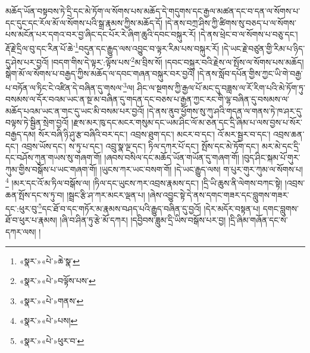མཆོད་ཡོན་བསྟབས་ཏེ་དྲི་དང་མེ་ཏོག་ལ་སོགས་པས་མཆོད་དེ་གདུགས་དང་རྒྱལ་མཚན་དང་བ་དན་ལ་སོགས་པ་དང་དུང་དང་རོལ་མོ་ལ་སོགས་པའི་སྒྲ་རྣམས་ཀྱིས་མཆོད་དོ། །དེ་ནས་བཀྲ་ཤིས་ཀྱི་ཚིགས་སུ་བཅད་པ་ལ་སོགས་པས་མངོན་པར་དགའ་བར་བྱ་ཞིང་དང་པོར་རེ་ཞིག་ཆུའི་དབང་བསྐུར་རོ། །དེ་ནས་ཕྲེང་བ་ལ་སོགས་པ་བཅུ་དང་། རྡོ་རྗེ་དྲིལ་བུ་དང་རིན་པོ་ཆེ་\footnote{«སྣར་»«པེ་»ཆེ་སྣ་}བདུན་དང་རྒྱུད་ལས་འབྱུང་བ་ལྟར་རིམ་པས་བསྐུར་རོ། །དེ་ཡང་རྗེ་བཙུན་གྱི་རིམ་པ་ཉིད་དུ་ཤེས་པར་བྱའོ། །བདག་གིས་དེ་ལྟར་:ལྟོས་པས་\footnote{«སྣར་»«པེ་»བལྟོས་པས་}མ་བྲིས་སོ། །དབང་བསྐུར་བའི་རྗེས་ལ་སྤོས་ལ་སོགས་པས་མཆོད། སྒེག་མོ་ལ་སོགས་པ་བརྒྱད་ཀྱིས་མཆོད་ལ་དབང་གཞན་བསྐུར་བར་བྱའོ། །དེ་ནས་སློབ་དཔོན་གྱིས་ཀྱང་ཡི་གེ་བརྒྱ་པ་བཏོན་ལ་ཏིང་ངེ་འཛིན་དེ་བཞིན་དུ་གསལ་\footnote{«སྣར་»«པེ་»གནས་}ལ། ཤིང་ལ་སྔགས་ཀྱི་རྒྱལ་པོ་མང་དུ་བཟླས་ལ་རོ་རིག་པའི་མེ་ཏོག་ཏུ་བསམས་ལ་དོར་བའམ་ཡང་ན་སྔ་མ་བཞིན་དུ་གདན་དང་བཅས་པ་རྒྱན་ཀྱང་རང་གི་ལྷ་བཞིན་དུ་བསམས་ལ་མཆོད་པའམ་ཡང་ན་གང་དུ་ཡང་མི་བསམ་པར་བྱའོ། །དེ་ནས་ནུབ་ཕྱོགས་སུ་ཀུ་ཤའི་གདན་ལ་གནས་ཏེ་ཁ་ཤར་དུ་བལྟས་ཏེ་སྦྱིན་སྲེག་བྱའོ། །རྫས་མར་ཁུ་དང་མངར་གསུམ་དང་ཡམ་ཤིང་ལོ་མ་ཅན་དང་དྲི་ཞིམ་པ་ལས་བྱས་པ་སོར་བརྒྱད་དམ། སོར་བཞི་ཉི་ཤུ་རྩ་བཞིའི་བར་དང་། འབྲས་ཐུག་དང་། མངར་བ་དང་། འོ་མར་སྦྱར་བ་དང་། འབྲས་ཆན་དང་། འབྲས་ཡོས་དང་། ས་ཏུ་པ་དང་། འབྲུ་སྣ་ལྔ་དང་། ཏིལ་དཀར་པོ་དང་། སྤོས་དང་མེ་ཏོག་དང་། མར་མེ་དང་དྲི་དང་བཤོས་ཀུན་གཡས་སུ་གཞག་གོ། །ཞབས་བསིལ་དང་མཆོད་ཡོན་གཡོན་དུ་གཞག་གོ། །བུད་ཤིང་སྐམ་པོ་གུར་ཀུམ་གྱིས་བསྒོས་པ་ཡང་གཞག་གོ། །ཡུངས་ཀར་ཡང་བསག་གོ། །དེ་ཡང་རྒྱུད་ལས། ག་པུར་གུར་ཀུམ་ལ་སོགས་པ།\footnote{«སྣར་»«པེ་»པས།} །མར་དང་འོ་མ་ཏིལ་བསྒོས་ལ། །ཏིལ་དང་ཡུངས་ཀར་འབྲས་རྣམས་དང་། །དྲི་ཡི་ཆུས་ནི་ལེགས་བཀང་སྟེ། །འབྲས་ཆན་སྤོས་དང་ས་ཏུ་བ། །སྦྲང་རྩི་ཤ་ཀར་མངར་ལྡན་པ། །ཞེས་འབྱུང་སྟེ་དེ་ནས་དགང་གཟར་དང་བླུགས་གཟར་དང་:ཕུར་བུ་\footnote{«སྣར་»«པེ་»ཕུར་བ་}དང་ཐོ་བ་དང་གཏོར་མ་རྣམས་བཤད་པའི་རྒྱུད་བཞིན་དུ་བྱའོ། །དེར་མདོར་བསྟན་པ། དགང་བླུགས་ཐོ་བ་ཕུར་པ་རྣམས། །ཞི་བ་ཤིན་ཏུ་རྩེ་མོ་དཀར། །དབྱིབས་ཟླུམ་དྲི་ཡིས་བསྒོས་པར་བྱ། །དྲི་ཞིམ་གཞོན་དང་ས་དཀར་ལས། །
